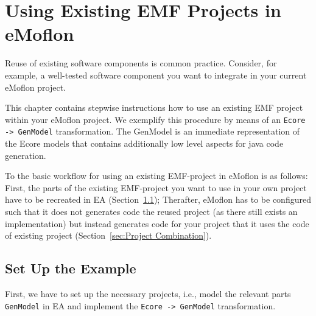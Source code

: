 

\section{Using Existing EMF Projects in eMoflon}
\label{sec : Ecore2GenModel}

Reuse of existing software components is common practice. Consider, for example, a well-tested software component you want to integrate in your current eMoflon project.
	
This chapter contains stepwise instructions how to use an existing EMF project within your eMoflon project. We exemplify this procedure by means of an \texttt{Ecore -> GenModel} transformation. The GenModel is an immediate representation of the Ecore models that contains additionally low level aspects for java code generation.

To the basic workflow for using an existing EMF-project in eMoflon is as follows:  First, the parts of the existing EMF-project you want to use in your own project have to be recreated in EA  (Section~\ref{sec: Set Up the Example}); Therafter, eMoflon has to be configured such that it does not generates code the reused project (as there still exists an implementation) but instead generates code for your project that it uses the code of existing project (Section~\ref{sec:Project Combination}).  





\subsection{Set Up the Example} %
\label{sec: Set Up the Example}

First, we have to set up the necessary projects, i.e., model the relevant parts \texttt{GenModel} in EA and implement the \texttt{Ecore -> GenModel} transformation. 

